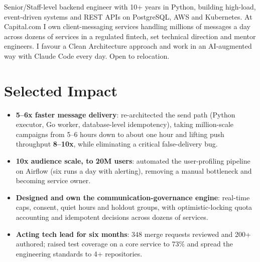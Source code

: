 \documentclass[11pt,a4paper,sans]{moderncv}
\begin{document}
\makecvtitle


\vspace{6pt}
\small{Senior/Staff-level backend engineer with 10+ years in Python, building high-load, event-driven systems and REST APIs on PostgreSQL, AWS and Kubernetes. At Capital.com I own client-messaging services handling millions of messages a day across dozens of services in a regulated fintech, set technical direction and mentor engineers. I favour a Clean Architecture approach and work in an AI-augmented way with Claude Code every day. Open to relocation.}


\section{Selected Impact}
\vspace{1pt}
\begin{itemize}

\item \textbf{5--6x faster message delivery}: re-architected the send path (Python executor, Go worker, database-level idempotency), taking million-scale campaigns from 5--6 hours down to about one hour and lifting push throughput \textbf{8--10x}, while eliminating a critical false-delivery bug.

\item \textbf{10x audience scale, to 20M users}: automated the user-profiling pipeline on Airflow (six runs a day with alerting), removing a manual bottleneck and becoming service owner.

\item \textbf{Designed and own the communication-governance engine}: real-time caps, consent, quiet hours and holdout groups, with optimistic-locking quota accounting and idempotent decisions across dozens of services.

\item \textbf{Acting tech lead for six months}: 348 merge requests reviewed and 200+ authored; raised test coverage on a core service to 73\% and spread the engineering standards to 4+ repositories.

\end{itemize}
\end{document}
